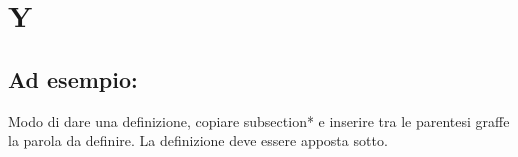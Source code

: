 \section*{Y}
\markright{}
\subsection*{Ad esempio:}
Modo di dare una definizione, copiare subsection*{} e inserire tra le parentesi graffe la parola da definire. La definizione deve essere apposta sotto.